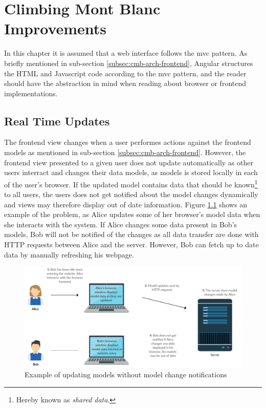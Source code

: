 \chapter{Climbing Mont Blanc Improvements}
\label{ch:improvements}

In this chapter it is assumed that a web interface follows the \gls{mvc} pattern. As briefly mentioned in sub-section \ref{subsec:cmb-arch-frontend}, Angular structures the HTML and Javascript code according to the \gls{mvc} pattern, and the reader should have the abstraction in mind when reading about browser or frontend implementations.

\section{Real Time Updates}
The frontend view changes when a user performes actions against the frontend models as mentioned in sub-section \ref{subsec:cmb-arch-frontend}. However, the frontend view presented to a given user does not update automatically as other users interract and changes their data models, as models is stored locally in each of the user's browser. If the updated model contains data that should be known\footnote{Hereby known as \textit{shared data}.} to all users, the users does not get notified about the model changes dynamically and views may therefore display out of date information. Figure \ref{fig:update-problem} shows an example of the problem, as Alice updates some of her browser's model data when she interacts with the system. If Alice changes some data present in Bob's models, Bob will not be notified of the changes as all data transfer are done with HTTP requests between Alice and the server. However, Bob can fetch up to date data by manually refreshing his webpage. \\

\begin{figure}
    \centering
    \includegraphics[width=1\textwidth]{figs/update_problem.jpg}
    \caption{Example of updating models without model change notifications}
    \label{fig:update-problem}
\end{figure}

